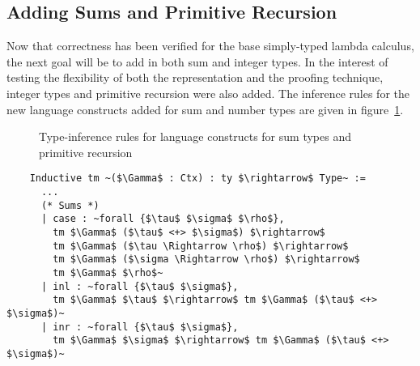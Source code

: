 \subsection{Adding Sums and Primitive Recursion}
  Now that correctness has been verified for the base simply-typed lambda calculus, the next goal will be to add in both sum and integer types.
  In the interest of testing the flexibility of both the representation and the proofing technique, integer types and primitive recursion were also added.
  The inference rules for the new language constructs added for sum and number types are given in figure~\ref{fig:sum_prim_infer}.

  \begin{figure}
    \caption{Type-inference rules for language constructs for sum types and primitive recursion}
    \label{fig:sum_prim_infer}
  \end{figure}

  \begin{verbatim}
    Inductive tm ~($\Gamma$ : Ctx) : ty $\rightarrow$ Type~ :=
      ...
      (* Sums *)
      | case : ~forall {$\tau$ $\sigma$ $\rho$},
        tm $\Gamma$ ($\tau$ <+> $\sigma$) $\rightarrow$
        tm $\Gamma$ ($\tau \Rightarrow \rho$) $\rightarrow$
        tm $\Gamma$ ($\sigma \Rightarrow \rho$) $\rightarrow$
        tm $\Gamma$ $\rho$~
      | inl : ~forall {$\tau$ $\sigma$},
        tm $\Gamma$ $\tau$ $\rightarrow$ tm $\Gamma$ ($\tau$ <+> $\sigma$)~
      | inr : ~forall {$\tau$ $\sigma$},
        tm $\Gamma$ $\sigma$ $\rightarrow$ tm $\Gamma$ ($\tau$ <+> $\sigma$)~
  \end{verbatim}

